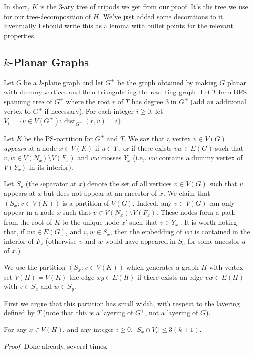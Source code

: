\documentclass{patmorin}
\DeclareMathOperator{\dist}{dist}
\begin{document}
In short, $K$ is the 3-ary tree of tripods we get from our proof.  It's the tree we use for our tree-decomposition of $H$.  We've just added some decorations to it. Eventually I should write this as a lemma with bullet points for the relevant properties.

\subsection{$k$-Planar Graphs}

Let $G$ be a $k$-plane graph and let $G^+$ be the graph obtained by making $G$ planar with dummy vertices and then triangulating the resulting graph. Let $T$ be a BFS spanning tree of $G^+$ where the root $r$ of $T$ has degree 3 in $G^+$ (add an additional vertex to $G^+$ if necessary). For each integer $i\ge 0$, let $V_i=\{v\in V(G^+): \dist_{G^+}(r,v)=i\}$.

Let $K$ be the PS-partition for $G^+$ and $T$.  We say that a vertex $v\in V(G)$ \emph{appears} at a node $x\in V(K)$ if $u\in Y_x$ or if there exists $vw\in E(G)$ such that $v,w\in V(N_x)\setminus V(F_x)$ and $vw$ crosses $Y_x$ (i.e,. $vw$ contains a dummy vertex of $V(Y_x)$ in its interior).

Let $S_x$ (the separator at $x$) denote the set of all vertices $v\in V(G)$ such that $v$ appears at $x$ but does not appear at an ancestor of $x$.  We claim that $(S_x:x\in V(K))$ is a partition of $V(G)$.  Indeed, any $v\in V(G)$ can only appear in a node $x$ such that $v\in V(N_x)\setminus V(F_x)$.  These nodes form a path from the root of $K$ to the unique node $x'$ such that $v\in Y_{x'}$.  It is worth noting that, if $vw\in E(G)$, and $v,w\in S_x$, then the embedding of $vw$ is contained in the interior of $F_x$ (otherwise $v$ and $w$ would have appeared in $S_a$ for some ancestor $a$ of $x$.)

We use the partition $(S_x: x\in V(K))$ which generates a graph $H$ with vertex set $V(H)=V(K)$ the edge $xy\in E(H)$ if there exists an edge $vw\in E(H)$ with $v\in S_x$ and $w\in S_y$. 

First we argue that this partition has small width, with respect to the layering defined by $T$ (note that this is a layering of $G^+$, not a layering of $G$).

\begin{clm}
  For any $x\in V(H)$, and any integer $i\ge 0$, $|S_x\cap V_i|\le 3(k+1)$.
\end{clm}

\begin{proof}
  Done already, several times.
\end{proof}
\end{document}
